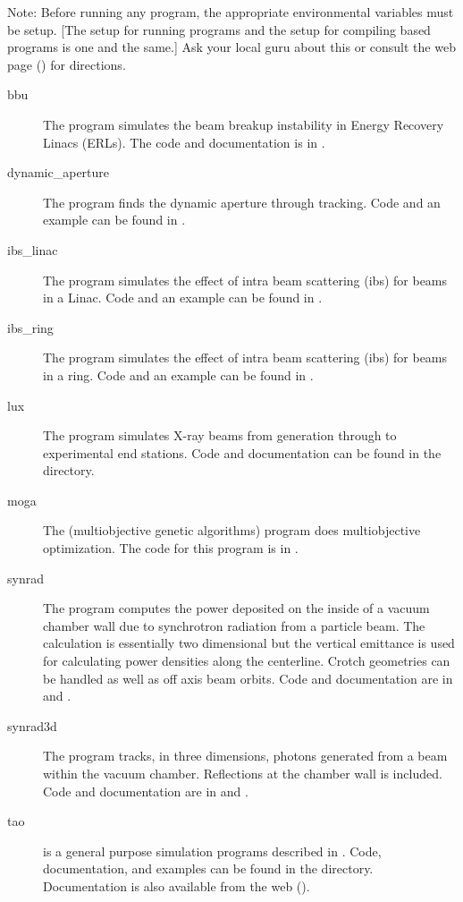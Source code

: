 \documentclass{hitec}
\begin{document}
Note: Before running any program, the appropriate environmental variables must be setup.
[The setup for running programs and the setup for compiling \bmad based programs is one
and the same.] Ask your local \bmad guru about this or consult the \bmad web page
() for directions.

  \begin{description}
  \item[bbu] \Newline
The  program simulates the beam breakup instability in Energy Recovery Linacs (ERLs).
The  code and documentation is in .
  \item[dynamic_aperture] \Newline
The  program finds the dynamic aperture through tracking. Code and an
example can be found in .
  \item[ibs_linac] \Newline
The  program simulates the effect of intra beam scattering (ibs) for beams
in a Linac. Code and an example can be found in .
  \item[ibs_ring] \Newline
The  program simulates the effect of intra beam scattering (ibs) for beams
in a ring. Code and an example can be found in .
  \item[lux] \Newline
The  program simulates X-ray beams from generation through to experimental end stations.
Code and documentation can be found in the  directory.
  \item[moga] \Newline
The  (multiobjective genetic algorithms) program does multiobjective
optimization. The code for this program is in .
  \item[synrad] \Newline
The  program computes the power deposited on the inside of a vacuum chamber
wall due to synchrotron radiation from a particle beam. The calculation is essentially two
dimensional but the vertical emittance is used for calculating power densities along the
centerline. Crotch geometries can be handled as well as off axis beam orbits. Code and
documentation are in  and . 
  \item[synrad3d] \Newline
The  program tracks, in three dimensions, photons generated from a beam
within the vacuum chamber. Reflections at the chamber wall is included. Code and
documentation are in  and .
  \item[tao] \Newline
\tao is a general purpose simulation programs described in . Code,
documentation, and examples can be found in the  directory. Documentation is also
available from the web ().
  \end{description}
\end{document}
